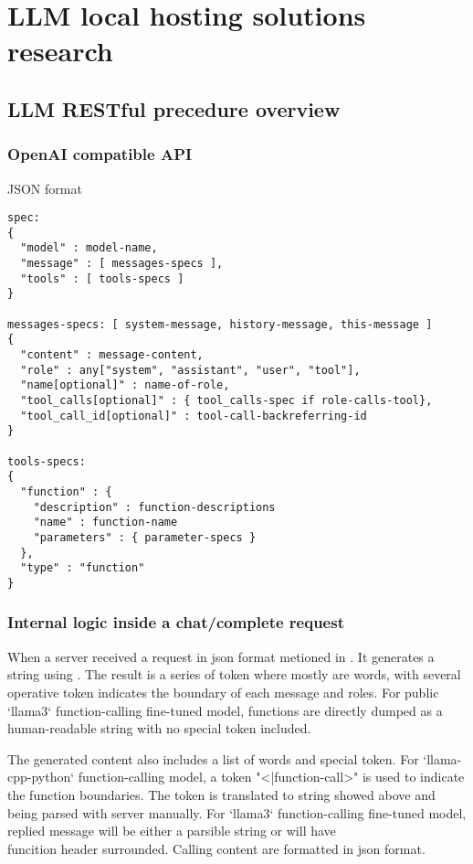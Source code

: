 \chapter{LLM local hosting solutions research}
\section{LLM RESTful precedure overview}
\subsection{OpenAI compatible API}
\label{sec:openai-v1-api}
JSON format
\begin{verbatim}
spec: 
{
  "model" : model-name,
  "message" : [ messages-specs ],
  "tools" : [ tools-specs ]
}

messages-specs: [ system-message, history-message, this-message ] 
{
  "content" : message-content,
  "role" : any["system", "assistant", "user", "tool"],
  "name[optional]" : name-of-role,
  "tool_calls[optional]" : { tool_calls-spec if role-calls-tool},
  "tool_call_id[optional]" : tool-call-backreferring-id
}

tools-specs:
{
  "function" : {
    "description" : function-descriptions
    "name" : function-name
    "parameters" : { parameter-specs }
  },
  "type" : "function"
}
\end{verbatim}

\subsection{Internal logic inside a chat/complete request}
When a server received a request in json format metioned in . It generates a string using 
. The result is a series of token where mostly are words, with 
several operative token indicates the boundary of each message and roles. For public `llama3` function-calling 
fine-tuned model, functions are directly dumped as a human-readable string with no special token included.

The generated content also includes a list of words and special token. For `llama-cpp-python` function-calling model, a 
token "<|function-call>" is used to indicate the function boundaries. The token is translated to string showed above and 
being parsed with server manually. For `llama3` function-calling fine-tuned model, replied message will be either a 
parsible string or will have \\funcition header surrounded. Calling content are formatted in json format.


